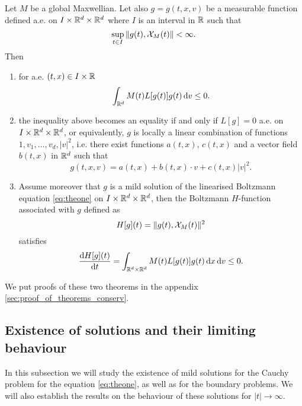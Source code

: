\begin{theorem}
	\label{th:H} Let $M$ be a global Maxwellian. Let  also $g=g(t,x,v)$ be a measurable function defined a.e. on $I\times{{\mathbb R^d}\times{\mathbb R^d}}$ where $I$ is an interval in ${\mathbb R}$ such that 
	\[\sup_{t\in I} \|g(t),{\mathcal X_M(t)}\|< \infty.\]
	Then
	\begin{enumerate}
		\item for a.e. $(t,x)\in I\times{\mathbb R}$
		\[\int_{{\mathbb R^d}}  M(t)L[g(t)]g(t){\,\mathrm{d} v}\le 0.\]
		\item the inequality above becomes an equality if and only if $L[g]=0$ a.e. on $I\times{{\mathbb R^d}\times{\mathbb R^d}}$, or equivalently, $g$ is locally a linear combination of functions $1,v_1,\ldots,v_d,|v|^2$, i.e. there exist functions $a(t,x)$, $c(t,x)$ and a vector field $b(t,x)$ in ${\mathbb R^d}$ such that
		\[g(t,x,v) = a(t,x)+b(t,x)\cdot v+c(t,x)|v|^2.\]
\item
		Assume moreover that $g$ is a mild solution of the linearised Boltzmann equation \eqref{eq:theone} on $I\times{{\mathbb R^d}\times{\mathbb R^d}}$, then the Boltzmann $H$-function associated with $g$ defined as 
		\[H[g](t) = \|g(t),{\mathcal X_M(t)}\|^2\]
		satisfies
		\[\frac{\mathrm d H[g](t)}{\mathrm dt}=\int_{{{\mathbb R^d}\times{\mathbb R^d}}} M(t)L[g(t)]g(t){\,\mathrm{d} x}{\,\mathrm{d} v}\le 0.\]
	\end{enumerate}
\end{theorem}
 We put proofs of these two theorems in the appendix \ref{sec:proof_of_theorems_conserv}.

\subsection{Existence of solutions and their limiting behaviour} %
\label{sub:existence_of_solutions}
In this subsection we will study the existence of mild solutions for the Cauchy problem for the equation \eqref{eq:theone}, as well as  for the boundary problems. We will also establish the results on the  behaviour of these solutions for $|t|\to \infty$.

